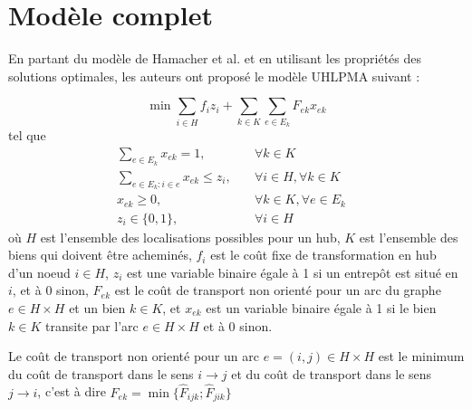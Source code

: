 \section{Modèle complet}

En partant du modèle de Hamacher et al. \cite[Adapting polyhedral properties from facility to hub location problems (2004)]{hln} et en utilisant les propriétés des solutions optimales, les auteurs ont proposé le modèle UHLPMA suivant : 

\[ \min \sum_{i \in H}f_iz_i + \sum_{k \in K}\sum_{e \in E_k}F_{ek}x_{ek}\]
tel que
\begin{subequations}
    \begin{align}
        \sum_{e \in E_k}x_{ek} = 1, \quad &\forall{k\in K}&\\
        \sum_{e \in E_k:i\in e}x_{ek} \le z_i,\quad &\forall{i \in H}, \forall{k\in K}&\\
        x_{ek} \ge 0, \quad &\forall{k \in K}, \forall{e \in E_k}&\\
        z_i\in \{0,1\},\quad &\forall{ i \in H}&
    \end{align}
\end{subequations}
 où $H$ est l'ensemble des localisations possibles pour un hub, $K$ est l'ensemble des biens qui doivent être acheminés, $f_i$ est le coût fixe de transformation en hub d'un noeud $i\in H$, $z_i$ est une variable binaire égale à 1 si un entrepôt est situé en $i$, et à 0 sinon, $F_{ek}$ est le coût de transport non orienté pour un arc du graphe $e \in H\times H$ et un bien $k \in K$, et $x_{ek}$ est un variable binaire égale à 1 si le bien $k \in K$ transite par l'arc $e \in H\times H$ et à 0 sinon.
 
 Le coût de transport non orienté pour un arc $e = (i,j) \in H\times H$ est le minimum du coût de transport dans le sens $i \rightarrow j$ et du coût de transport dans le sens $j \rightarrow i$, c'est à dire $F_{ek} = \min \{ \hat{F}_{ijk};\hat{F}_{jik}\}$


